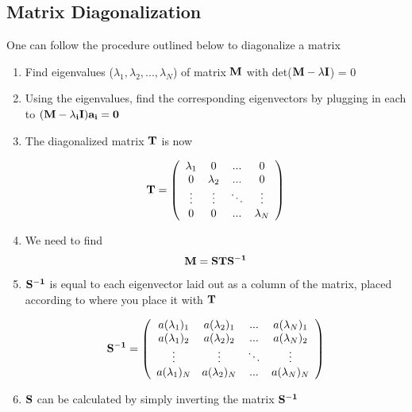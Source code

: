 \subsection{Matrix Diagonalization}\label{diagolize}
One can follow the procedure outlined below to diagonalize a matrix\cite{griffiths_qm}

\begin{enumerate}
\item Find eigenvalues ($\lambda_1, \lambda_2, ... , \lambda_N$) of matrix $\bf{M}$ with det($\bf{M}-\lambda\bf{I}$) = 0
\item Using the eigenvalues, find the corresponding eigenvectors by plugging in each to $(\bf{M}-\lambda_i\bf{I})\bf{a_i} = 0$
\item The diagonalized matrix $\bf{T}$ is now 

$$\bf{T} = \left(
{\begin{array}{cccc}
\lambda_1 & 0 &...&0 \\
0 & \lambda_2 & ...&0\\
\vdots & \vdots &\ddots & \vdots \\
0 & 0 & ... &\lambda_N
\end{array}}
\right)
$$

\item We need to find$$ \bf{M} = \bf{STS^{-1}}$$
\item $\bf{S^{-1}}$ is equal to each eigenvector laid out as a column of the matrix, placed according to where you place it with $\bf{T}$

$$\bf{S^{-1}} = \left(
{\begin{array}{cccc}
a(\lambda_1)_1 & a(\lambda_2)_1 &...&a(\lambda_N)_1 \\
a(\lambda_1)_2 & a(\lambda_2)_2 & ...&a(\lambda_N)_2\\
\vdots & \vdots &\ddots & \vdots \\
a(\lambda_1)_N & a(\lambda_2)_N & ... &a(\lambda_N)_N
\end{array}}
\right)
$$

\item $\bf{S}$ can be calculated by simply inverting the matrix $\bf{S^{-1}}$
\end{enumerate}

